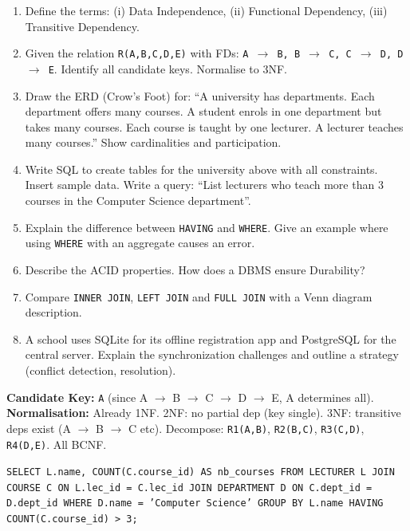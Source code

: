\documentclass[11pt]{article}
\begin{document}
\begin{exercice}
\begin{enumerate}
\item Define the terms: (i) Data Independence, (ii) Functional Dependency, (iii) Transitive Dependency.
\item Given the relation \texttt{R(A,B,C,D,E)} with FDs: \texttt{A $\to$ B, B $\to$ C, C $\to$ D, D $\to$ E}. Identify all candidate keys. Normalise to 3NF.
\item Draw the ERD (Crow's Foot) for: ``A university has departments. Each department offers many courses. A student enrols in one department but takes many courses. Each course is taught by one lecturer. A lecturer teaches many courses.'' Show cardinalities and participation.
\item Write SQL to create tables for the university above with all constraints. Insert sample data. Write a query: ``List lecturers who teach more than 3 courses in the Computer Science department''.
\item Explain the difference between \texttt{HAVING} and \texttt{WHERE}. Give an example where using \texttt{WHERE} with an aggregate causes an error.
\item Describe the ACID properties. How does a DBMS ensure Durability?
\item Compare \texttt{INNER JOIN}, \texttt{LEFT JOIN} and \texttt{FULL JOIN} with a Venn diagram description.
\item A school uses SQLite for its offline registration app and PostgreSQL for the central server. Explain the synchronization challenges and outline a strategy (conflict detection, resolution).
\end{enumerate}
\end{exercice}

\begin{corrige}
\textbf{Candidate Key:} \texttt{A} (since A $\to$ B $\to$ C $\to$ D $\to$ E, A determines all). \textbf{Normalisation:} Already 1NF. 2NF: no partial dep (key single). 3NF: transitive deps exist (A $\to$ B $\to$ C etc). Decompose:
\texttt{R1(A,B)}, \texttt{R2(B,C)}, \texttt{R3(C,D)}, \texttt{R4(D,E)}. All BCNF.
\end{corrige}

\begin{corrige}
\texttt{SELECT L.name, COUNT(C.course\_id) AS nb\_courses FROM LECTURER L JOIN COURSE C ON L.lec\_id = C.lec\_id JOIN DEPARTMENT D ON C.dept\_id = D.dept\_id WHERE D.name = 'Computer Science' GROUP BY L.name HAVING COUNT(C.course\_id) > 3;}
\end{corrige}
\end{document}
